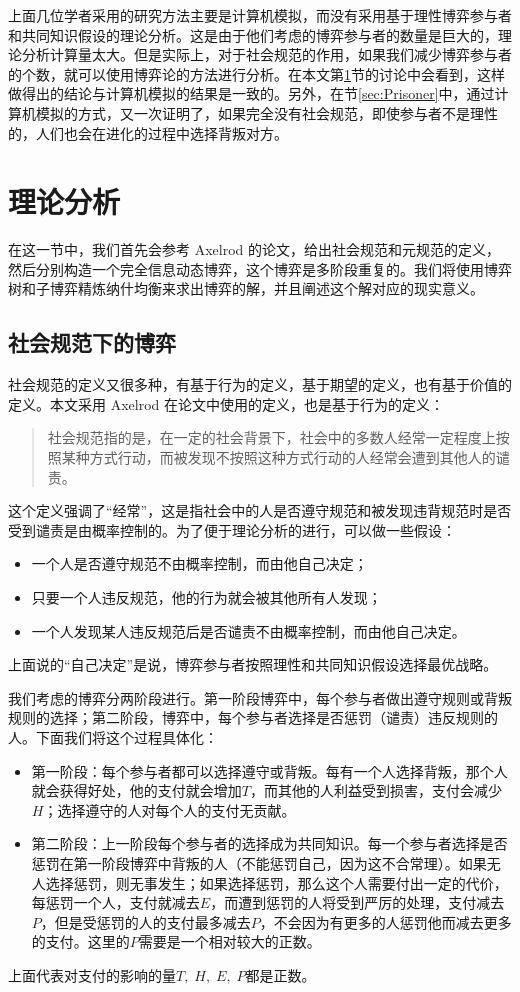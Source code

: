 \documentclass[lang=cn,11pt]{elegantpaper}
\begin{document}
上面几位学者采用的研究方法主要是计算机模拟，而没有采用基于理性博弈参与者和共同知识假设的理论分析。这是由于他们考虑的博弈参与者的数量是巨大的，理论分析计算量太大。但是实际上，对于社会规范的作用，如果我们减少博弈参与者的个数，就可以使用博弈论的方法进行分析。在本文第\ref{sec:Theory}节的讨论中会看到，这样做得出的结论与计算机模拟的结果是一致的。另外，在节\ref{sec:Prisoner}中，通过计算机模拟的方式，又一次证明了，如果完全没有社会规范，即使参与者不是理性的，人们也会在进化的过程中选择背叛对方。


\section{理论分析}\label{sec:Theory}
在这一节中，我们首先会参考 Axelrod 的论文\cite{Axelrod1986}，给出社会规范和元规范的定义，然后分别构造一个完全信息动态博弈，这个博弈是多阶段重复的。我们将使用博弈树和子博弈精炼纳什均衡来求出博弈的解，并且阐述这个解对应的现实意义。

\subsection{社会规范下的博弈}
社会规范的定义又很多种，有基于行为的定义，基于期望的定义，也有基于价值的定义。本文采用 Axelrod 在论文\cite{Axelrod1986}中使用的定义，也是基于行为的定义：
\begin{quotation}
	社会规范指的是，在一定的社会背景下，社会中的多数人经常一定程度上按照某种方式行动，而被发现不按照这种方式行动的人经常会遭到其他人的谴责。
\end{quotation}
这个定义强调了“经常”，这是指社会中的人是否遵守规范和被发现违背规范时是否受到谴责是由概率控制的。为了便于理论分析的进行，可以做一些假设：
\begin{itemize}
	\setlength{\itemsep}{0.7ex}
	\item 一个人是否遵守规范不由概率控制，而由他自己决定；
	\item 只要一个人违反规范，他的行为就会被其他所有人发现；
	\item 一个人发现某人违反规范后是否谴责不由概率控制，而由他自己决定。
\end{itemize}
上面说的“自己决定”是说，博弈参与者按照理性和共同知识假设选择最优战略。

我们考虑的博弈分两阶段进行。第一阶段博弈中，每个参与者做出遵守规则或背叛规则的选择；第二阶段，博弈中，每个参与者选择是否惩罚（谴责）违反规则的人。下面我们将这个过程具体化：
\begin{itemize}
	\item 第一阶段：每个参与者都可以选择遵守或背叛。每有一个人选择背叛，那个人就会获得好处，他的支付就会增加$T$，而其他的人利益受到损害，支付会减少$H$；选择遵守的人对每个人的支付无贡献。
	\item 第二阶段：上一阶段每个参与者的选择成为共同知识。每一个参与者选择是否惩罚在第一阶段博弈中背叛的人（不能惩罚自己，因为这不合常理）。如果无人选择惩罚，则无事发生；如果选择惩罚，那么这个人需要付出一定的代价，每惩罚一个人，支付就减去$E$，而遭到惩罚的人将受到严厉的处理，支付减去$P$，但是受惩罚的人的支付最多减去$P$，不会因为有更多的人惩罚他而减去更多的支付。这里的$P$需要是一个相对较大的正数。
\end{itemize}
上面代表对支付的影响的量$T,\;H,\;E,\;P$都是正数。
\end{document}

